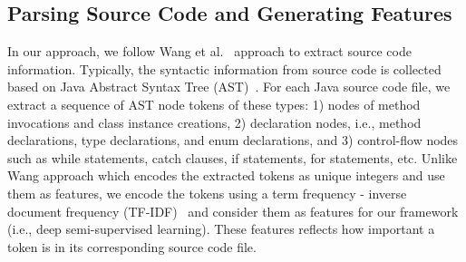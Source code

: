 \subsection{Parsing Source Code and Generating Features}
\label{sec:parsing}

In our approach, we follow Wang et al.~\cite{wang2016automatically} approach to extract source code information. Typically, the syntactic information from source code is collected based on Java Abstract Syntax Tree (AST)~\cite{neamtiu2005understanding}. For each Java source code file, we extract a sequence of AST node tokens of these types: 1) nodes of method invocations and class instance creations, 2) declaration nodes, i.e., method declarations, type declarations, and enum declarations, and 3) control-flow nodes such as while statements, catch clauses, if statements, for statements, etc. Unlike Wang approach which encodes the extracted tokens as unique integers and use them as features, we encode the tokens using a term frequency - inverse document frequency (TF-IDF)~\cite{manning2008introduction} and consider them as features for our framework (i.e., deep semi-supervised learning). These features reflects how important a token is in its corresponding source code file.



